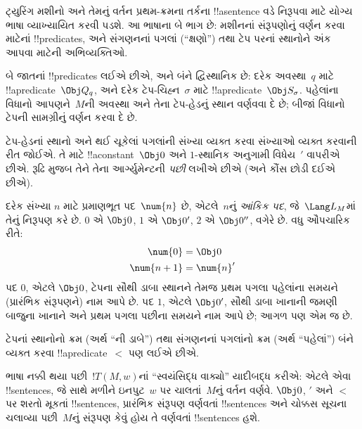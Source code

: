 \documentclass[../../../include/open-logic-section]{subfiles}
\begin{document}

\begin{explain}
ટ્યુરિંગ મશીનો અને તેમનું વર્તન પ્રથમ-ક્રમના તર્કના
!!a{sentence} વડે નિરૂપવા માટે યોગ્ય ભાષા વ્યાખ્યાયિત
કરવી પડશે. આ ભાષાના બે ભાગ છે: મશીનનાં સંરૂપણોનું
વર્ણન કરવા માટેનાં !!{predicate}s, અને સંગણનનાં પગલાં
(``ક્ષણો'') તથા ટેપ પરનાં સ્થાનોને અંક આપવા માટેની
અભિવ્યક્તિઓ.

બે જાતનાં !!{predicate}s લઈએ છીએ, અને બંને દ્વિસ્થાનિક
છે: દરેક અવસ્થા~$q$ માટે !!a{predicate}~$\Obj Q_q$,
અને દરેક ટેપ-ચિહ્ન~$\sigma$ માટે
!!a{predicate}~$\Obj S_\sigma$. પહેલાંના વિધાનો
આપણને~$M$ની અવસ્થા અને તેના ટેપ-હેડનું સ્થાન
વર્ણવવા દે છે; બીજાં વિધાનો ટેપની સામગ્રીનું વર્ણન
કરવા દે છે.

ટેપ-હેડનાં સ્થાનો અને થઈ ચૂકેલાં પગલાંની સંખ્યા
વ્યક્ત કરવા સંખ્યાઓ વ્યક્ત કરવાની રીત જોઈએ. તે માટે
!!a{constant}~$\Obj 0$ અને $1$-સ્થાનિક અનુગામી
વિધેય~$\prime$ વાપરીએ છીએ. રૂઢિ મુજબ તેને તેના
આર્ગ્યુમેન્ટની \emph{પછી} લખીએ છીએ (અને કૌંસ
છોડી દઈએ છીએ).

દરેક સંખ્યા $n$ માટે પ્રમાણભૂત પદ~$\num{n}$ છે,
એટલે~$n$નું \emph{આંકિક પદ}, જે~$\Lang L_M$માં
તેનું નિરૂપણ કરે છે. $\num{0}$ એ $\Obj 0$,
$\num{1}$ એ $\Obj 0'$, $\num{2}$ એ $\Obj 0''$,
વગેરે છે. વધુ ઔપચારિક રીતે:
\begin{align*}
\num{0} & = \Obj 0 \\
\num{n+1} &= \num{n}'
\end{align*}
પદ $\num{0}$, એટલે $\Obj 0$, ટેપના સૌથી ડાબા
સ્થાનને તેમજ પ્રથમ પગલા પહેલાંના સમયને (પ્રારંભિક
સંરૂપણને) નામ આપે છે. પદ $\num{1}$, એટલે
$\Obj 0'$, સૌથી ડાબા ખાનાની જમણી બાજુના ખાનાને
અને પ્રથમ પગલા પછીના સમયને નામ આપે છે; આગળ
પણ એમ જ છે.

ટેપનાં સ્થાનોનો ક્રમ (અર્થ ``ની ડાબે'') તથા
સંગણનનાં પગલાંનો ક્રમ (અર્થ ``પહેલાં'') બંને વ્યક્ત
કરવા !!a{predicate}~$<$ પણ લઈએ છીએ.

ભાષા નક્કી થયા પછી~$!T(M, w)$નાં ``સ્વયંસિદ્ધ વાક્યો''
યાદીબદ્ધ કરીએ: એટલે એવા !!{sentence}s, જે સાથે
મળીને ઇનપુટ~$w$ પર ચાલતાં~$M$નું વર્તન વર્ણવે.
$\Obj 0$, $\prime$ અને $<$ પર શરતો મૂકતાં !!{sentence}s,
પ્રારંભિક સંરૂપણ વર્ણવતાં !!{sentence}s અને ચોક્કસ સૂચના
ચલાવ્યા પછી~$M$નું સંરૂપણ કેવું હોય તે વર્ણવતાં
!!{sentence}s હશે.
\end{explain}
\end{document}
